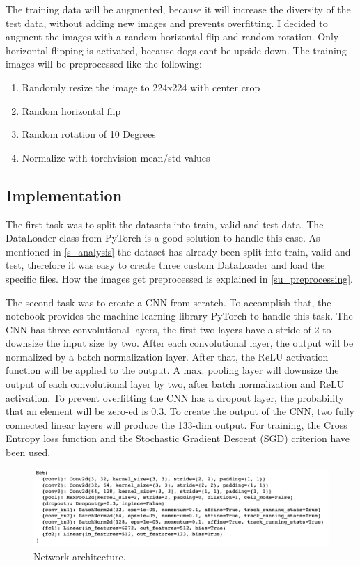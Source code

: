 \documentclass{article}
\begin{document}
The training data will be augmented, because it will increase the diversity of the test data, without adding new images and prevents overfitting. I decided to augment the images with a random horizontal flip and random rotation. Only horizontal flipping is activated, because dogs cant be upside down. The training images will be preprocessed like the following:
\begin{enumerate}
	\item Randomly resize the image to 224x224 with center crop
	\item Random horizontal flip
	\item Random rotation of 10 Degrees
	\item Normalize with torchvision mean/std values
\end{enumerate}

\subsection{Implementation}
The first task  was to split the datasets into train, valid and test data. The DataLoader class from PyTorch is a good solution to handle this case. As mentioned in \ref{s_analysis} the dataset has already been split into train, valid and test, therefore it was easy to create three custom DataLoader and load the specific files. How the images get preprocessed is explained in \ref{su_preprocessing}.\newline

The second task was to create a CNN from scratch. To accomplish that, the notebook provides the machine learning library PyTorch to handle this task.\newline
The CNN has three convolutional layers, the first two layers have a stride of 2 to downsize the input size by two. After each convolutional layer, the output will be normalized by a batch normalization layer. After that, the ReLU activation function will be applied to the output. A max. pooling layer will downsize the output of each convolutional layer by two, after batch normalization and ReLU activation. To prevent overfitting the CNN has a dropout layer, the probability that an element will be zero-ed is 0.3. To create the output of the CNN, two fully connected linear layers will produce the 133-dim output.\newline
For training, the Cross Entropy loss function and the Stochastic Gradient Descent (SGD) criterion have been used.
\begin{figure}[h]
    \centering
    \includegraphics[scale=0.45]{./images/model_scratch_architecture}
    \caption{Network architecture.}
    \label{fig:scratch_network_architecture}
\end{figure}
\end{document}

